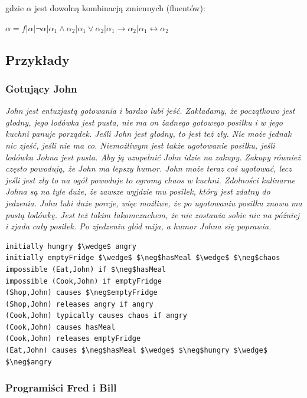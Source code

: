 \documentclass{article}
\begin{document}
gdzie $\alpha$ jest dowolną kombinacją zmiennych (fluentów): 
\begin{center}
$\alpha= f | \alpha | \neg\alpha | \alpha_{1} \land \alpha_{2} | \alpha_{1} \lor \alpha_{2} | \alpha_{1} \to \alpha_{2} | \alpha_{1} \leftrightarrow \alpha_{2} $
\end{center}

\subsection{Przykłady} 
\subsubsection{Gotujący John}


\textit{John jest entuzjastą gotowania i bardzo lubi jeść. Zakładamy, że początkowo jest głodny, jego lodówka jest pusta, nie ma on żadnego gotowego posiłku i w jego kuchni panuje porządek. Jeśli John jest głodny, to jest też zły. Nie może jednak nic zjeść, jeśli nie ma co. Niemożliwym jest także ugotowanie posiłku, jeśli lodówka Johna jest pusta. Aby ją uzupełnić John idzie na zakupy. Zakupy również często powodują, że John ma lepszy humor. John może teraz coś ugotować, lecz jeśli jest zły to na ogół powoduje to ogromy chaos w kuchni. Zdolności kulinarne Johna są na tyle duże, że zawsze wyjdzie mu posiłek, który jest zdatny do jedzenia. John lubi duże porcje, więc możliwe, że po ugotowaniu posiłku znowu ma pustą lodówkę. Jest też takim łakomczuchem, że nie zostawia sobie nic na później i zjada cały posiłek. Po zjedzeniu głód mija, a humor Johna się poprawia.}

\bigskip
{}
\begin{lstlisting}[mathescape=true]
initially hungry $\wedge$ angry
initially emptyFridge $\wedge$ $\neg$hasMeal $\wedge$ $\neg$chaos 
impossible (Eat,John) if $\neg$hasMeal 
impossible (Cook,John) if emptyFridge
(Shop,John) causes $\neg$emptyFridge
(Shop,John) releases angry if angry
(Cook,John) typically causes chaos if angry
(Cook,John) causes hasMeal 
(Cook,John) releases emptyFridge 
(Eat,John) causes $\neg$hasMeal $\wedge$ $\neg$hungry $\wedge$ $\neg$angry
\end{lstlisting}

\subsubsection{Programiści Fred i Bill}
\end{document}
